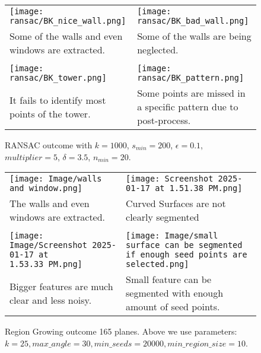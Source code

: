 \documentclass[a4paper,9pt]{article}
\begin{document}
\begin{figure}[H]
    \begin{tabularx}{\textwidth}{XX}
        \texttt{[image: ransac/BK\_nice\_wall.png]} & 
        \texttt{[image: ransac/BK\_bad\_wall.png]} \\
        Some of the walls and even windows are extracted. & Some of the walls are being neglected. \\\\
        \texttt{[image: ransac/BK\_tower.png]} & 
        \texttt{[image: ransac/BK\_pattern.png]} \\
        It fails to identify most points of the tower. & Some points are missed in a specific pattern due to post-process.
    \end{tabularx}
    \caption{RANSAC outcome with $k=1000$, $s_{min}=200$, $\epsilon=0.1$, $multiplier=5$, $\delta=3.5$, $n_{min}=20$.}
    \label{fig:ransac_viz_2}
\end{figure}



\begin{figure}[H]
    \begin{tabularx}{\textwidth}{XX}
        \texttt{[image: Image/walls and window.png]} & 
        \texttt{[image: Screenshot 2025-01-17 at 1.51.38 PM.png]} \\
        The walls and even windows are extracted. & Curved Surfaces are not clearly segmented \\\\
        \texttt{[image: Image/Screenshot 2025-01-17 at 1.53.33 PM.png]} & 
        \texttt{[image: Image/small surface can be segmented if enough seed points are selected.png]} \\
        Bigger features are much clear and less noisy. & Small feature can be segmented with enough amount of seed points.
    \end{tabularx}
    \caption{Region Growing outcome 165 planes. Above we use parameters: $k = 25,
max\_angle = 30, min\_seeds = 20000, min\_region\_size = 10$.}
\end{figure}
\end{document}
